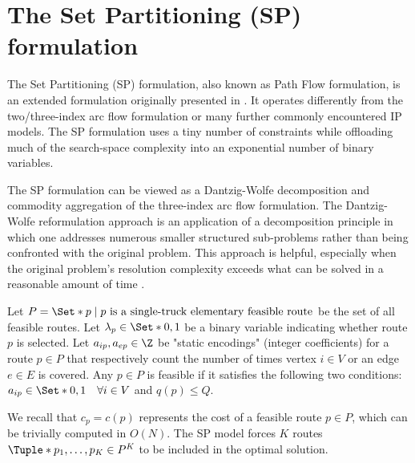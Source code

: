 \section{The Set Partitioning (SP) formulation}
\label{sec:set-partitionining-formulation}

The Set Partitioning (SP) formulation,
also known as Path Flow formulation,
is an extended formulation originally presented in \textcite{balinski1964}.
It operates differently from the two/three-index arc flow formulation or many further commonly encountered IP models.
The SP formulation uses a tiny number of constraints
while offloading much of the search-space complexity into an exponential number of binary variables.

The SP formulation can be viewed as a Dantzig-Wolfe decomposition \parencite{dantzig1960}
and commodity aggregation \parencite{desaulniers1998}
of the three-index arc flow formulation.
The Dantzig-Wolfe reformulation approach is an application of a
decomposition principle in which one addresses numerous smaller structured sub-problems
rather than being confronted with the original problem.
This approach is helpful, especially when the
original problem's resolution complexity
exceeds what can be solved in a reasonable amount of time \parencite{vanderbeck2005}.

Let $P = \Set*{p \mid p\ \text{is a single-truck elementary feasible route}}$ be the set of all feasible routes.
Let $\lambda_p \in \Set*{0, 1}$ be a binary variable indicating whether route $p$ is selected.
Let $a_{ip}, a_{ep} \in \Z$ be "static encodings" (integer coefficients)
for a route $p \in P$ that respectively count
the number of times vertex $i \in V$ or an edge $e \in E$ is covered.
Any $p \in P$ is feasible if it satisfies the following two conditions:
$a_{ip} \in \Set*{0, 1} \quad \forall i \in V$ and $q(p) \le Q$.

We recall that $c_p = c(p)$ represents the cost of a feasible route $p \in P$,
which can be trivially computed in $O(N)$.
The SP model forces $K$ routes $\Tuple*{p_1, \dots, p_K} \in P^K$ to be included in the optimal solution.


